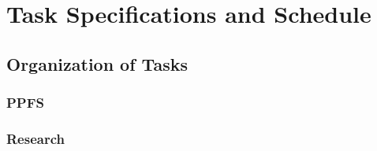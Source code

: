 \documentclass[ppfs.tex]{template/subfiles}
\begin{document}
\begin{comment}
These are the requirements as stated in the template given by Profess M.

Detailed task specifications are a key part of your design.  Tasks that take more than a day or two should be broken down into sub-tasks whenever possible.  Typically tasks specs and schedule are combined since they are intimately related.  The percentage complete on each task should be included in the PPFS.  Address any issues related to tasks that are behind schedule in the project management section.  Organize tasks hierarchically, such as system architecture, mechanical, electrical (hardware, software), etc.  Provide block diagrams to help explain how you divided the project into various phases/parts/categories.  
Many teams make the mistake of thinking the prototype is the design.  This is rarely the case.  Only a few teams produce a single device.  Most are designing a product that can be mass produced.  Thus the prototype is your method of validating your production design.   It is a major test or validation activity on the way to completing the design.  Include prototyping activities as tasks that help you finish the production design.  
Summarize your schedule by reporting the total expected person-hours needed to complete the design.  The best reports track the schedule progress by reporting the month by month estimate of total person-hours and graphing how it changed as you gained experience.
\end{comment}

\section{Task Specifications and Schedule}

\subsection{Organization of Tasks}

\subsubsection{PPFS}
\subsubsection{Research}
\end{document}
